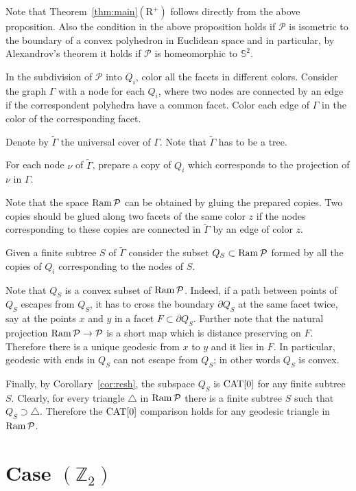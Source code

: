 \documentclass{compositio}
\begin{document}
Note that Theorem~\ref{thm:main}$(\mathrm{R}^+)$
follows directly from the above proposition.
Also the condition in the above proposition holds if $\mathcal{P}$ is isometric to the boundary of a convex polyhedron in Euclidean space
and in particular, by Alexandrov's theorem it holds if $\mathcal{P}$ is homeomorphic to $\mathbb{S}^2$.

In the subdivision of $\mathcal{P}$ into $Q_i$,
color all the facets in different colors.
Consider the graph $\Gamma$ with a node for each $Q_i$, where two nodes are connected by an edge if the correspondent polyhedra have a common facet. Color each edge of $\Gamma$ in the color of the corresponding facet.

Denote by $\tilde\Gamma$ the universal cover of $\Gamma$.
Note that $\tilde\Gamma$ has to be a tree.

For each node $\nu$ of $\tilde\Gamma$,  prepare a copy of $Q_i$ which corresponds to the projection of $\nu$ in $\Gamma$.

Note that  the space $\mathop{\rm Ram}\nolimits\mathcal{P}$
can be obtained by gluing the prepared copies.
Two copies should be glued along two facets of the same color $z$
if the nodes corresponding to these copies are connected in $\tilde\Gamma$
by an edge of color $z$.

Given a finite subtree $S$ of $\tilde \Gamma$
consider the subset $Q_S\subset \mathop{\rm Ram}\nolimits\mathcal{P}$
formed by all the copies of $Q_i$ corresponding to the nodes of $S$.

Note that $Q_S$ is a convex subset of $\mathop{\rm Ram}\nolimits\mathcal{P}$.
Indeed, if a path between points of $Q_S$ escapes from $Q_S$,
it has to cross the boundary $\partial Q_S$
at the same facet twice, say at the points $x$ and $y$ in 
a facet $F\subset\partial Q_S$.
Further note that the natural projection $\mathop{\rm Ram}\nolimits\mathcal{P}\to \mathcal{P}$ is a short map which is distance preserving on $F$.
Therefore there is a unique geodesic from $x$ to $y$ and it lies in $F$.
In particular, geodesic with ends in $Q_S$ can not escape from $Q_S$;
in other words $Q_S$ is convex.


Finally, by Corollary~\ref{cor:resh},
the subspace $Q_S$ is  $\mathrm{CAT}[0]$ for any finite subtree $S$.
Clearly, for every triangle $\triangle$ in $\mathop{\rm Ram}\nolimits\mathcal{P}$
there is a finite subtree $S$ such that $Q_S\supset\triangle$.
Therefore the $\mathrm{CAT}[0]$ comparison holds for any geodesic triangle in $\mathop{\rm Ram}\nolimits\mathcal{P}$.
\qeds

\section{Case $(\mathbb{Z}_2)$}
\end{document}
